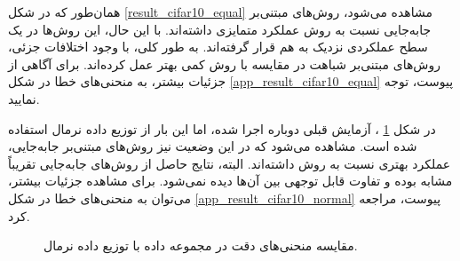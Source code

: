 همان‌طور که در شکل
\ref{result_cifar10_equal}
مشاهده می‌شود، روش‌های مبتنی‌بر جابه‌جایی نسبت به روش
عملکرد متمایزی داشته‌اند. با این حال، این روش‌ها در یک سطح عملکردی نزدیک به هم قرار گرفته‌اند. به طور کلی، با وجود اختلافات جزئی، روش‌های مبتنی‌بر شباهت در مقایسه با روش
کمی بهتر عمل کرده‌اند. برای آگاهی از جزئیات بیشتر، به منحنی‌های خطا در شکل
\ref{app_result_cifar10_equal}
پیوست، توجه نمایید.


در شکل
\ref{result_cifar10_normal}%
، آزمایش قبلی دوباره اجرا شده، اما این بار از توزیع داده نرمال استفاده شده است. مشاهده می‌شود که در این وضعیت نیز روش‌های مبتنی‌بر جابه‌جایی، عملکرد بهتری نسبت به روش
داشته‌اند. البته، نتایج حاصل از روش‌های جابه‌جایی تقریباً مشابه بوده و تفاوت قابل توجهی بین آن‌ها دیده نمی‌شود. برای مشاهده جزئیات بیشتر، می‌توان به منحنی‌های خطا در شکل
\ref{app_result_cifar10_normal}
پیوست، مراجعه کرد.

\begin{figure}[h]
	\centering
	\hspace{0.8mm}
	\caption{
		مقایسه منحنی‌های دقت در مجموعه داده
		با توزیع داده نرمال.
	}
	\label{result_cifar10_normal}
\end{figure}




